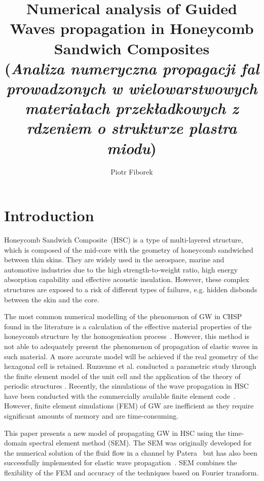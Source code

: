\documentclass[a4paper,12pt]{article}
\author{Piotr Fiborek}
\title{Numerical analysis of Guided Waves propagation in Honeycomb Sandwich Composites\\
(\textit{Analiza numeryczna propagacji fal prowadzonych w wielowarstwowych materia\l{}ach przek\l{}adkowych z rdzeniem o strukturze plastra miodu})}
\begin{document}
\maketitle
\thispagestyle{empty}
\section{Introduction}
\label{sec:intro}
Honeycomb Sandwich Composite~(HSC) is a type of multi-layered structure, which 
is composed of the mid-core with the geometry of honeycomb sandwiched between 
thin skins.
They are widely used in the aerospace, marine and automotive industries due to 
the high strength-to-weight ratio, high energy absorption capability and 
effective acoustic insulation. However, these complex structures are exposed to 
a risk of different types of failures, e.g. hidden disbonds between the skin 
and the core.



The most common numerical modelling of the phenomenon of GW in CHSP found in 
the literature is a calculation of the effective material properties of the 
honeycomb structure by the homogenisation process~\cite{qi2008ultrasonic, 
mustapha2011assessment, baid2015dispersion, sikdar2016guided}.
However, this method is not able to adequately present the phenomenon of 
propagation of elastic waves in such material.
A more accurate model will be achieved if the real geometry of the hexagonal 
cell is retained.
Ruzzenne et al. conducted a parametric study through the finite element model 
of the unit cell and the application of the theory of periodic structures 
\cite{ruzzene2003wave}.
Recently, the simulations of the wave propagation in HSC have been conducted 
with the commercially available finite element code~\cite{song2009guided, 
hosseini2013numerical, tian2015wavenumber, zhao2018wave}.
However, finite element simulations (FEM) of GW are inefficient as they require 
significant amounts of memory and are time-consuming.

This paper presents a new model of propagating GW in HSC using the time-domain 
spectral element method (SEM).
The SEM was originally developed for the numerical solution of the fluid flow 
in a channel by Patera~\cite{patera1984spectral} but has also been successfully 
implemented for elastic wave propagation~\cite{ostachowicz2011guided}.
SEM combines the flexibility of the FEM and accuracy of the techniques based on 
Fourier transform. 
\end{document}
